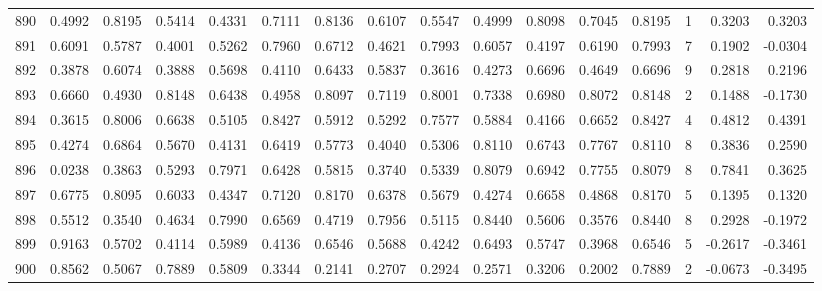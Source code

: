 \begin{tabular}{lrrrrrrrrrrrrrrr}
890 &      0.4992 &  0.8195 &  0.5414 &  0.4331 &  0.7111 &  0.8136 &  0.6107 &  0.5547 &  0.4999 &  0.8098 &   0.7045 &     0.8195 &      1 &                    0.3203 &                     0.3203 \\
891 &      0.6091 &  0.5787 &  0.4001 &  0.5262 &  0.7960 &  0.6712 &  0.4621 &  0.7993 &  0.6057 &  0.4197 &   0.6190 &     0.7993 &      7 &                    0.1902 &                    -0.0304 \\
892 &      0.3878 &  0.6074 &  0.3888 &  0.5698 &  0.4110 &  0.6433 &  0.5837 &  0.3616 &  0.4273 &  0.6696 &   0.4649 &     0.6696 &      9 &                    0.2818 &                     0.2196 \\
893 &      0.6660 &  0.4930 &  0.8148 &  0.6438 &  0.4958 &  0.8097 &  0.7119 &  0.8001 &  0.7338 &  0.6980 &   0.8072 &     0.8148 &      2 &                    0.1488 &                    -0.1730 \\
894 &      0.3615 &  0.8006 &  0.6638 &  0.5105 &  0.8427 &  0.5912 &  0.5292 &  0.7577 &  0.5884 &  0.4166 &   0.6652 &     0.8427 &      4 &                    0.4812 &                     0.4391 \\
895 &      0.4274 &  0.6864 &  0.5670 &  0.4131 &  0.6419 &  0.5773 &  0.4040 &  0.5306 &  0.8110 &  0.6743 &   0.7767 &     0.8110 &      8 &                    0.3836 &                     0.2590 \\
896 &      0.0238 &  0.3863 &  0.5293 &  0.7971 &  0.6428 &  0.5815 &  0.3740 &  0.5339 &  0.8079 &  0.6942 &   0.7755 &     0.8079 &      8 &                    0.7841 &                     0.3625 \\
897 &      0.6775 &  0.8095 &  0.6033 &  0.4347 &  0.7120 &  0.8170 &  0.6378 &  0.5679 &  0.4274 &  0.6658 &   0.4868 &     0.8170 &      5 &                    0.1395 &                     0.1320 \\
898 &      0.5512 &  0.3540 &  0.4634 &  0.7990 &  0.6569 &  0.4719 &  0.7956 &  0.5115 &  0.8440 &  0.5606 &   0.3576 &     0.8440 &      8 &                    0.2928 &                    -0.1972 \\
899 &      0.9163 &  0.5702 &  0.4114 &  0.5989 &  0.4136 &  0.6546 &  0.5688 &  0.4242 &  0.6493 &  0.5747 &   0.3968 &     0.6546 &      5 &                   -0.2617 &                    -0.3461 \\
900 &      0.8562 &  0.5067 &  0.7889 &  0.5809 &  0.3344 &  0.2141 &  0.2707 &  0.2924 &  0.2571 &  0.3206 &   0.2002 &     0.7889 &      2 &                   -0.0673 &                    -0.3495 \\

\end{tabular}
